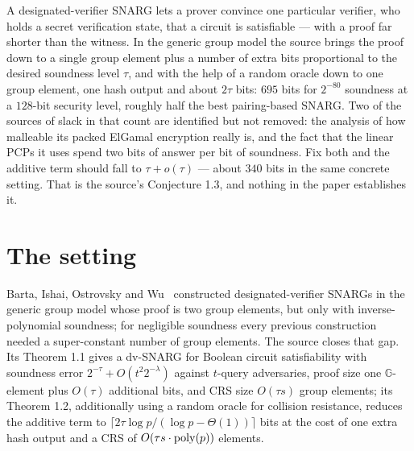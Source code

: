 \documentclass{aicr-conjecture}
\newcommand{\G}{\mathbb{G}}
\begin{document}

\vspace{0.4em}

\begin{informalconjecture}
A designated-verifier SNARG lets a prover convince one particular
verifier, who holds a secret verification state, that a circuit is
satisfiable --- with a proof far shorter than the witness. In the generic
group model the source brings the proof down to a single group element
plus a number of extra bits proportional to the desired soundness level
$\tau$, and with the help of a random oracle down to one group element,
one hash output and about $2\tau$ bits: $695$ bits for $2^{-80}$
soundness at a $128$-bit security level, roughly half the best
pairing-based SNARG\@. Two of the sources of slack in that count are
identified but not removed: the analysis of how malleable its packed
ElGamal encryption really is, and the fact that the linear PCPs it uses
spend two bits of answer per bit of soundness. Fix both and the additive
term should fall to $\tau + o(\tau)$ --- about $340$ bits in the same
concrete setting. That is the source's Conjecture 1.3, and nothing in the
paper establishes it.
\end{informalconjecture}

\section{The setting}\label{sec:setting}

Barta, Ishai, Ostrovsky and Wu~\cite{BIOW20} constructed
designated-verifier SNARGs in the generic group model whose proof is two
group elements, but only with inverse-polynomial soundness; for
negligible soundness every previous construction needed a super-constant
number of group elements. The source closes that gap. Its Theorem 1.1
gives a dv-SNARG for Boolean circuit satisfiability with soundness error
$2^{-\tau} + O(t^{2} 2^{-\lambda})$ against $t$-query adversaries, proof
size one $\G$-element plus $O(\tau)$ additional bits, and CRS size
$O(\tau s)$ group elements; its Theorem 1.2, additionally using a random
oracle for collision resistance, reduces the additive term to
$\lceil 2\tau \log p / (\log p - \Theta(1)) \rceil$ bits at the cost of
one extra hash output and a CRS of $O(\tau s \cdot \mathrm{poly}(p))$ elements.
\end{document}
